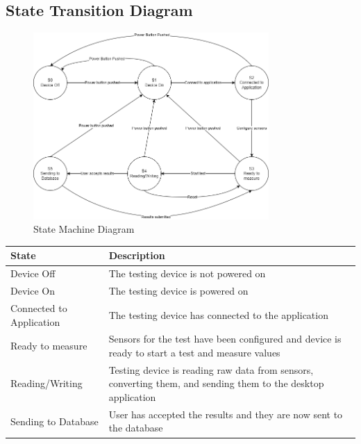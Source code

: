 \documentclass[12pt]{article}
\begin{document}
\subsection{State Transition Diagram}
\begin{figure}[h!]
\begin{center}
\includegraphics[width=0.8\textwidth]{state_machine_diagram}
\caption{State Machine Diagram}
\label{Fig_StateMachineDiagram} 
\end{center}
\end{figure}

\begin{tabular}{| p{} | p{}|}
  \hline
  \rowcolor[gray]{0.9}
  State & Description \\
  \hline
  Device Off & The testing device is not powered on\\
  \hline
  Device On &  The testing device is powered on\\
  \hline
  Connected to Application & The testing device has connected to the application \\
  \hline
  Ready to measure & Sensors for the test have been configured and device is ready to start a test and measure values \\
  \hline
  Reading/Writing & Testing device is reading raw data from sensors, converting them, and sending them to the desktop application \\
  \hline
  Sending to Database & User has accepted the results and they are now sent to the database \\
  \hline
\end{tabular}
\end{document}
